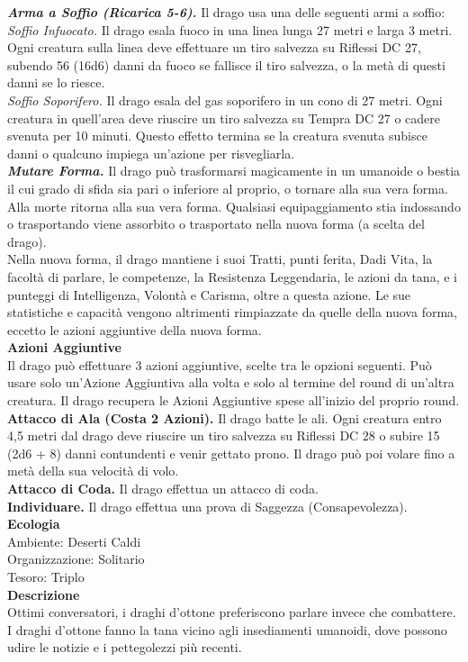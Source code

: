 \begin{multicols}{2}
\emph{\textbf{Arma a Soffio (Ricarica 5-6).}} Il drago usa una delle seguenti armi a soffio:\\
\emph{Soffio Infuocato.} Il drago esala fuoco in una linea lunga 27 metri e larga 3 metri. Ogni creatura sulla linea deve effettuare un tiro salvezza su Riflessi DC  27, subendo 56 (16d6) danni da fuoco se fallisce il tiro salvezza, o la metà di questi danni se lo riesce.\\
\emph{Soffio Soporifero.} Il drago esala del gas soporifero in un cono di 27 metri. Ogni creatura in quell'area deve riuscire un tiro salvezza su Tempra DC  27 o cadere svenuta per 10 minuti. Questo effetto termina se la creatura svenuta subisce danni o qualcuno impiega un'azione per risvegliarla.\\
\emph{\textbf{Mutare Forma.}} Il drago può trasformarsi magicamente in un umanoide o bestia il cui grado di sfida sia pari o inferiore al proprio, o tornare alla sua vera forma. Alla morte ritorna alla sua vera forma. Qualsiasi equipaggiamento stia indossando o trasportando viene assorbito o trasportato nella nuova forma (a scelta del drago). \\
Nella nuova forma, il drago mantiene i suoi Tratti, punti ferita, Dadi Vita, la facoltà di parlare, le competenze, la Resistenza Leggendaria, le azioni da tana, e i punteggi di Intelligenza, Volontà e Carisma, oltre a questa azione. Le sue statistiche e capacità vengono altrimenti rimpiazzate da quelle della nuova forma, eccetto le azioni aggiuntive della nuova forma.\\
\textbf{Azioni Aggiuntive}\\
Il drago può effettuare 3 azioni aggiuntive, scelte tra le opzioni seguenti. Può usare solo un'Azione Aggiuntiva alla volta e solo al termine del round di un'altra creatura. Il drago recupera le Azioni Aggiuntive spese all'inizio del proprio round.\\
\textbf{Attacco di Ala (Costa 2 Azioni).} Il drago batte le ali. Ogni creatura entro 4,5 metri dal drago deve riuscire un tiro salvezza su Riflessi DC  28 o subire 15 (2d6 + 8) danni contundenti e venir gettato prono. Il drago può poi volare fino a metà della sua velocità di volo.\\
\textbf{Attacco di Coda.} Il drago effettua un attacco di coda.\\
\textbf{Individuare.} Il drago effettua una prova di Saggezza (Consapevolezza).\\
\textbf{Ecologia}\\
Ambiente: Deserti Caldi\\
Organizzazione: Solitario\\
Tesoro: Triplo\\
\textbf{Descrizione}\\
Ottimi conversatori, i draghi d’ottone preferiscono parlare invece che combattere. I draghi d’ottone fanno la tana vicino agli insediamenti umanoidi, dove possono udire le notizie e i pettegolezzi più recenti.\\



\end{multicols}
